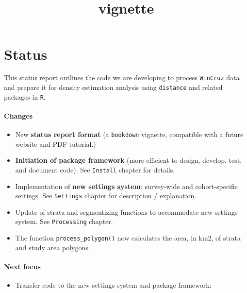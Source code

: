 \documentclass[
]{book}
\title{vignette}
\author{}
\date{\vspace{-2.5em}}
\providecommand{\tightlist}{%
  \setlength{\itemsep}{0pt}\setlength{\parskip}{0pt}}
\begin{document}
\maketitle

{
\setcounter{tocdepth}{1}
\tableofcontents
}
\hypertarget{status}{%
\chapter{Status}\label{status}}

This status report outlines the code we are developing to process \texttt{WinCruz} data and prepare it for density estimation analysis using \texttt{distance} and related packages in \texttt{R}.

\hypertarget{changes}{%
\subsubsection*{Changes}\label{changes}}

\begin{itemize}
\item
  New \textbf{status report format} (a \texttt{bookdown} vignette, compatible with a future website and PDF tutorial.)
\item
  \textbf{Initiation of package framework} (more efficient to design, develop, test, and document code). See \texttt{Install} chapter for details.
\item
  Implementation of \textbf{new settings system}: survey-wide and cohort-specific settings. See \texttt{Settings} chapter for description / explanation.
\item
  Update of strata and segmentizing functions to accommodate new settings system. See \texttt{Processing} chapter.
\item
  The function \texttt{process\_polygon()} now calculates the area, in km2, of strata and study area polygons.
\end{itemize}

\hypertarget{next-focus}{%
\subsubsection*{Next focus}\label{next-focus}}

\begin{itemize}
\tightlist
\item
  Transfer code to the new settings system and package framework:
\end{itemize}
\end{document}
